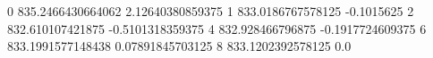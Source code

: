 0 835.2466430664062 2.12640380859375
1 833.0186767578125 -0.1015625
2 832.610107421875 -0.5101318359375
4 832.928466796875 -0.1917724609375
6 833.1991577148438 0.07891845703125
8 833.1202392578125 0.0
